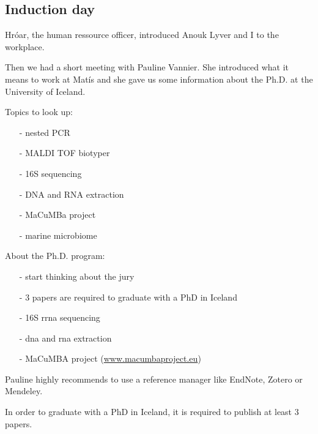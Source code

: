 \subsection{Induction day}
\label{task:20170109_cj0}


Hróar, the human ressource officer, introduced Anouk Lyver and I to the workplace. 

Then we had a short meeting with Pauline Vannier. She introduced what it means to work at Matís and she gave us some information about the Ph.D. at the University of Iceland.

Topics to look up:
\begin{itemize}
    \item[-] nested PCR
    \item[-] MALDI TOF biotyper
    \item[-] 16S sequencing
    \item[-] DNA and RNA extraction
    \item[-] MaCuMBa project
    \item[-] marine microbiome \citep{stal2016marine}
\end{itemize}

About the Ph.D. program:
\begin{itemize}
    \item[-] start thinking about the jury
    \item[-] 3 papers are required to graduate with a PhD in Iceland
    \item[-] 16S \gls{rrna} sequencing
    \item[-] \gls{dna} and \gls{rna} extraction
    \item[-] MaCuMBA project (\url{www.macumbaproject.eu})
\end{itemize}

Pauline highly recommends to use a reference manager like EndNote, Zotero or Mendeley. 

In order to graduate with a PhD in Iceland, it is required to publish at least 3 papers.
